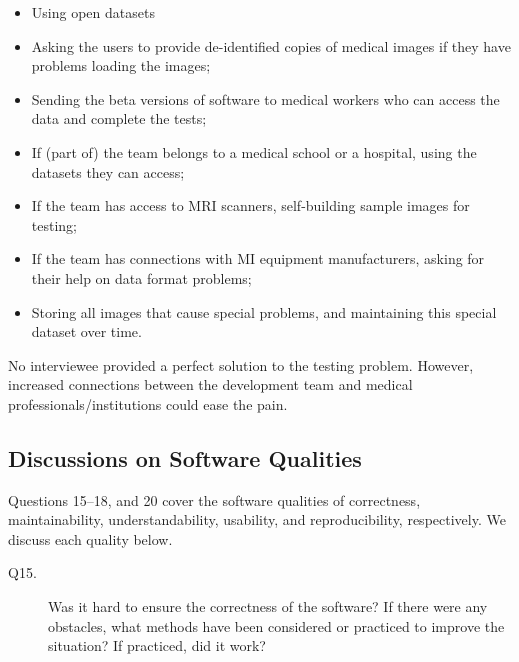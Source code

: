 \documentclass[final, 3p, times, authoryear]{elsarticle}
\begin{document}
\begin{itemize}
\item Using open datasets
\item Asking the users to provide de-identified copies of medical images if they
have problems loading the images;
\item Sending the beta versions of software to medical workers who can access
the data and complete the tests;
\item If (part of) the team belongs to a medical school or a hospital, using the
datasets they can access;
\item If the team has access to MRI scanners, self-building sample images for
testing;
\item If the team has connections with MI equipment manufacturers, asking for
their help on data format problems;
\item Storing all images that cause special problems, and maintaining this
special dataset over time.
\end{itemize}

No interviewee provided a perfect solution to the testing problem. However,
increased connections between the development team and medical
professionals/institutions could ease the pain.

\subsection{Discussions on Software Qualities} \label{sec_interview_software_qualities}

Questions 15--18, and 20 cover the software qualities of correctness,
maintainability, understandability, usability, and reproducibility,
respectively. We discuss each quality below.

\begin{description}
\item[Q15.] Was it hard to ensure the correctness of the software? If there were
any obstacles, what methods have been considered or practiced to improve the
situation? If practiced, did it work?
\end{description}
\end{document}

